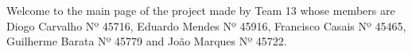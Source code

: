 Welcome to the main page of the project made by {\ttfamily Team 13} whose members are Diogo Carvalho Nº 45716, Eduardo Mendes Nº 45916, Francisco Casais Nº 45465, Guilherme Barata Nº 45779 and João Marques Nº 45722. 